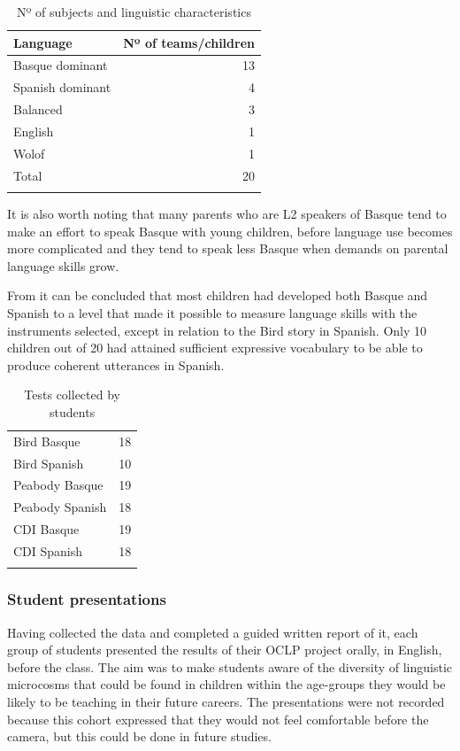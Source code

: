 \documentclass[output=paper]{../langscibook}
\begin{document}
\begin{table}
\begin{tabularx}{.8\textwidth}{Xr}
\lsptoprule
Language & Nº of teams\slash children\\\midrule
Basque dominant & 13\\ 
Spanish dominant & 4\\
Balanced & 3\\
English & 1\\
Wolof & 1\\\midrule
Total & 20\\\lspbottomrule
\end{tabularx}
\caption{Nº of subjects and linguistic characteristics\label{tab:6:1}}
\end{table}

It is also worth noting that many parents who are L2 speakers of Basque tend to make an effort to speak Basque with young children, before language use becomes more complicated and they tend to speak less Basque when demands on parental language skills grow.

From  it can be concluded that most children had developed both Basque and Spanish to a level that made it possible to measure language skills with the instruments selected, except in relation to the Bird story in Spanish. Only 10 children out of 20 had attained sufficient expressive vocabulary to be able to produce coherent utterances in Spanish.

\begin{table}
\begin{tabularx}{.8\textwidth}{Xr}
\lsptoprule
Bird Basque & 18\\
Bird Spanish & 10\\
Peabody Basque & 19\\
Peabody Spanish & 18\\
CDI Basque & 19\\
CDI Spanish & 18\\\lspbottomrule
\end{tabularx}
\caption{Tests collected by students\label{tab:6:2}}
\end{table}


\subsubsection{Student presentations}


Having collected the data and completed a guided written report of it, each group of students presented the results of their OCLP project orally, in English, before the class. The aim was to make students aware of the diversity of linguistic microcosms that could be found in children within the age-groups they would be likely to be teaching in their future careers. The presentations were not recorded because this cohort expressed that they would not feel comfortable before the camera, but this could be done in future studies.
\end{document}
